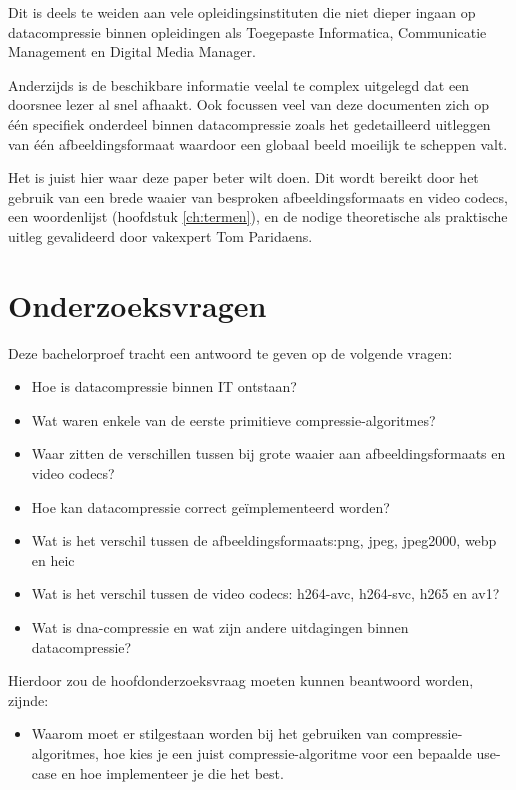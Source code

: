 Dit is deels te weiden aan vele opleidingsinstituten die niet dieper ingaan op \gls{datacompressie} binnen opleidingen als Toegepaste Informatica, Communicatie Management en Digital Media Manager.

Anderzijds is de beschikbare informatie veelal te complex uitgelegd dat een doorsnee lezer al snel afhaakt. Ook focussen veel van deze documenten zich op één specifiek onderdeel binnen \gls{datacompressie} zoals het gedetailleerd uitleggen van één \gls{afbeeldingsformaat} waardoor een globaal beeld moeilijk te scheppen valt.

Het is juist hier waar deze paper beter wilt doen. Dit wordt bereikt door het gebruik van een brede waaier van besproken \glspl{afbeeldingsformaat} en video \glspl{codec}, een woordenlijst (hoofdstuk \ref{ch:termen}), en de nodige theoretische als praktische uitleg gevalideerd door vakexpert Tom Paridaens.

\section{Onderzoeksvragen}
\label{sec:onderzoeksvragen}
Deze bachelorproef tracht een antwoord te geven op de volgende vragen: 
\begin{itemize}
	\item Hoe is \gls{datacompressie} binnen IT ontstaan?
	\item Wat waren enkele van de eerste primitieve \glspl{compressie-algoritme}?
	\item Waar zitten de verschillen tussen bij grote waaier aan \glspl{afbeeldingsformaat} en video \glspl{codec}?
	\item Hoe kan \gls{datacompressie} correct geïmplementeerd worden?
	\item Wat is het verschil tussen de \glspl{afbeeldingsformaat}:\gls{png}, \gls{jpeg}, \gls{jpeg2000}, \gls{webp} en \gls{heic}
	\item Wat is het verschil tussen de video \glspl{codec}: \gls{h264-avc}, \gls{h264-svc}, \gls{h265} en \gls{av1}?
	\item Wat is \gls{dna-compressie} en wat zijn andere uitdagingen binnen \gls{datacompressie}?
\end{itemize}

Hierdoor zou de hoofdonderzoeksvraag moeten kunnen beantwoord worden, zijnde:
\begin{itemize}
	\item Waarom moet er stilgestaan worden bij het gebruiken van \glspl{compressie-algoritme}, hoe kies je een juist \gls{compressie-algoritme} voor een bepaalde \gls{use-case} en hoe implementeer je die het best.
\end{itemize}

